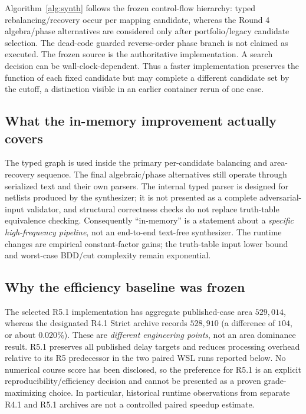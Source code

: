 \documentclass[journal,10pt]{IEEEtran}
\begin{document}
Algorithm~\ref{alg:synth} follows the frozen control-flow hierarchy: typed rebalancing/recovery occur per mapping candidate, whereas the Round 4 algebra/phase alternatives are considered only after portfolio/legacy candidate selection. The dead-code guarded reverse-order phase branch is not claimed as executed. The frozen source is the authoritative implementation. A search decision can be wall-clock-dependent. Thus a faster implementation preserves the function of each fixed candidate but may complete a different candidate set by the cutoff, a distinction visible in an earlier container rerun of one case.

\subsection{What the in-memory improvement actually covers}
The typed graph is used inside the primary per-candidate balancing and area-recovery sequence. The final algebraic/phase alternatives still operate through serialized text and their own parsers. The internal typed parser is designed for netlists produced by the synthesizer; it is not presented as a complete adversarial-input validator, and structural correctness checks do not replace truth-table equivalence checking. Consequently ``in-memory'' is a statement about a \emph{specific high-frequency pipeline}, not an end-to-end text-free synthesizer. The runtime changes are empirical constant-factor gains; the truth-table input lower bound and worst-case BDD/cut complexity remain exponential.

\subsection{Why the efficiency baseline was frozen}
The selected R5.1 implementation has aggregate published-case area $529{,}014$, whereas the designated R4.1 Strict archive records $528{,}910$ (a difference of $104$, or about $0.020\%$). These are \emph{different engineering points}, not an area dominance result. R5.1 preserves all published delay targets and reduces processing overhead relative to its R5 predecessor in the two paired WSL runs reported below. No numerical course score has been disclosed, so the preference for R5.1 is an explicit reproducibility/efficiency decision and cannot be presented as a proven grade-maximizing choice. In particular, historical runtime observations from separate R4.1 and R5.1 archives are not a controlled paired speedup estimate.
\end{document}
